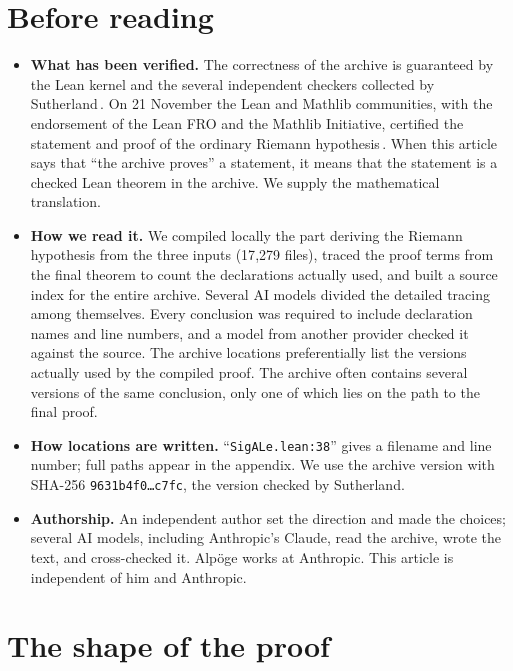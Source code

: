 \documentclass[11pt]{article}
\newcommand{\Lean}[1]{\texttt{\small #1}}
\begin{document}
\section*{Before reading}
\begin{itemize}
\item \textbf{What has been verified.} The correctness of the archive is guaranteed by the Lean kernel and the several independent checkers collected by Sutherland\,\cite{sutherland}. On 21 November the Lean and Mathlib communities, with the endorsement of the Lean FRO and the Mathlib Initiative, certified the statement and proof of the ordinary Riemann hypothesis\,\cite{leanfro}. When this article says that ``the archive proves'' a statement, it means that the statement is a checked Lean theorem in the archive. We supply the mathematical translation.
\item \textbf{How we read it.} We compiled locally the part deriving the Riemann hypothesis from the three inputs (17{,}279 files), traced the proof terms from the final theorem to count the declarations actually used, and built a source index for the entire archive. Several AI models divided the detailed tracing among themselves. Every conclusion was required to include declaration names and line numbers, and a model from another provider checked it against the source. The archive locations preferentially list the versions actually used by the compiled proof. The archive often contains several versions of the same conclusion, only one of which lies on the path to the final proof.
\item \textbf{How locations are written.} ``\Lean{SigALe.lean:38}'' gives a filename and line number; full paths appear in the appendix. We use the archive version with SHA-256 \Lean{9631b4f0\ldots c7fc}, the version checked by Sutherland.
\item \textbf{Authorship.} An independent author set the direction and made the choices; several AI models, including Anthropic's Claude, read the archive, wrote the text, and cross-checked it. Alpöge works at Anthropic. This article is independent of him and Anthropic.
\end{itemize}

\section*{The shape of the proof}\label{sec:shape}
\end{document}
